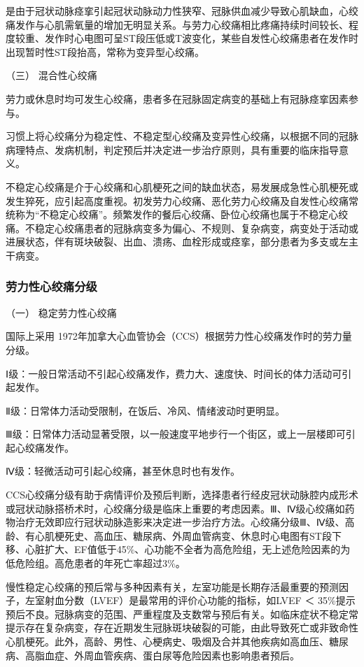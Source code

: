 是由于冠状动脉痉挛引起冠状动脉动力性狭窄、冠脉供血减少导致心肌缺血，心绞痛发作与心肌需氧量的增加无明显关系。与劳力心绞痛相比疼痛持续时间较长、程度较重、发作时心电图可呈ST段压低或T波变化，某些自发性心绞痛患者在发作时出现暂时性ST段抬高，常称为变异型心绞痛。

\hypertarget{text00309.htmlux5cux23CHP10-7-2-4-3}{}
（三） 混合性心绞痛

劳力或休息时均可发生心绞痛，患者多在冠脉固定病变的基础上有冠脉痉挛因素参与。

习惯上将心绞痛分为稳定性、不稳定型心绞痛及变异性心绞痛，以根据不同的冠脉病理特点、发病机制，判定预后并决定进一步治疗原则，具有重要的临床指导意义。

不稳定心绞痛是介于心绞痛和心肌梗死之间的缺血状态，易发展成急性心肌梗死或发生猝死，应引起高度重视。初发劳力心绞痛、恶化劳力心绞痛及自发性心绞痛常统称为“不稳定心绞痛”。频繁发作的餐后心绞痛、卧位心绞痛也属于不稳定心绞痛。不稳定心绞痛患者的冠脉病变多为偏心、不规则、复杂病变，病变处于活动或进展状态，伴有斑块破裂、出血、溃疡、血栓形成或痉挛，部分患者为多支或左主干病变。

\subsubsection{劳力性心绞痛分级}

\hypertarget{text00309.htmlux5cux23CHP10-7-2-5-1}{}
（一） 稳定劳力性心绞痛

国际上采用
1972年加拿大心血管协会（CCS）根据劳力性心绞痛发作时的劳力量分级。

Ⅰ级：一般日常活动不引起心绞痛发作，费力大、速度快、时间长的体力活动可引起发作。

Ⅱ级：日常体力活动受限制，在饭后、冷风、情绪波动时更明显。

Ⅲ级：日常体力活动显著受限，以一般速度平地步行一个街区，或上一层楼即可引起心绞痛发作。

Ⅳ级：轻微活动可引起心绞痛，甚至休息时也有发作。

CCS心绞痛分级有助于病情评价及预后判断，选择患者行经皮冠状动脉腔内成形术或冠状动脉搭桥术时，心绞痛分级是临床上重要的考虑因素。Ⅲ、Ⅳ级心绞痛如药物治疗无效即应行冠状动脉造影来决定进一步治疗方法。心绞痛分级Ⅲ、Ⅳ级、高龄、有心肌梗死史、高血压、糖尿病、外周血管病变、休息时心电图有ST段下移、心脏扩大、EF值低于45\%、心功能不全者为高危险组，无上述危险因素的为低危险组。高危患者的年死亡率超过3\%。

慢性稳定心绞痛的预后常与多种因素有关，左室功能是长期存活最重要的预测因子，左室射血分数（LVEF）是最常用的评价心功能的指标，如LVEF
＜
35\%提示预后不良。冠脉病变的范围、严重程度及支数常与预后有关。如临床症状不稳定常提示存在复杂病变，存在近期发生冠脉斑块破裂的可能，由此导致死亡或非致命性心肌梗死。此外，高龄、男性、心梗病史、吸烟及合并其他疾病如高血压、糖尿病、高脂血症、外周血管疾病、蛋白尿等危险因素也影响患者预后。

